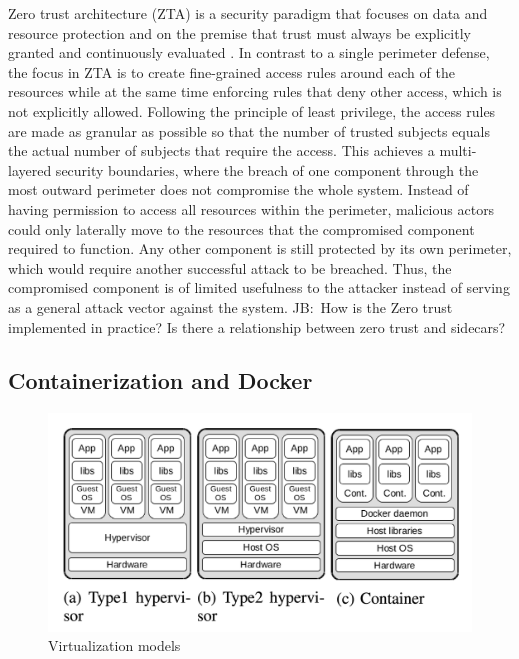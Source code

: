 \documentclass[english, 12pt, a4paper, sci, utf8, a-2b, online]{aaltothesis}
\newcommand{\mycomment}[3]{\textcolor{#1}{#2:~#3}}
\newcommand{\jb}[1]{\noindent\mycomment{aaltoRed}{JB}{#1}}
\begin{document}
Zero trust architecture (ZTA) is a security paradigm that focuses on data and resource protection and on the premise that trust must always be explicitly granted and continuously evaluated \cite{kerman2020implementing, rose2020zero}.
In contrast to a single perimeter defense, the focus in ZTA is to create fine-grained access rules around each of the resources while at the same time enforcing rules that deny other access, which is not explicitly allowed.
Following the principle of least privilege, the access rules are made as granular as possible so that the number of trusted subjects equals the actual number of subjects that require the access.
This achieves a multi-layered security boundaries, where the breach of one component through the most outward perimeter does not compromise the whole system.
Instead of having permission to access all resources within the perimeter, malicious actors could only laterally move to the resources that the compromised component required to function.
Any other component is still protected by its own perimeter, which would require another successful attack to be breached.
Thus, the compromised component is of limited usefulness to the attacker instead of serving as a general attack vector against the system.
\jb{How is the Zero trust implemented in practice? Is there a relationship between zero trust and sidecars?}

\subsection{Containerization and Docker}

\begin{figure}[h!]
  \centering
  \includegraphics[width=\linewidth]{files/figure-1.png}
  \caption{Virtualization models \cite{combe2016docker}} %
  \label{figure-1}
\end{figure}
\end{document}
